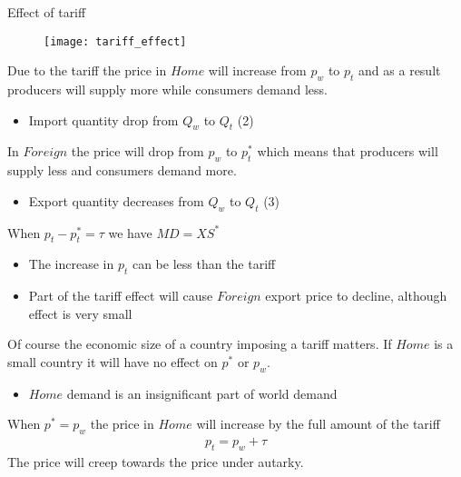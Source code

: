 \documentclass{beamer}
\begin{document}
\begin{frame}{Effect of tariff}
  \begin{figure}
    \texttt{[image: tariff\_effect]}
  \end{figure}
\end{frame}

\begin{frame}
  Due to the tariff the price in $Home$ will increase from $p_{w}$ to $p_t$ and as a result producers will supply more while consumers demand less.
  \begin{itemize}    
    \item Import quantity drop from $Q_w$ to $Q_t$ (2)
  \end{itemize}
  \medskip
  In $Foreign$ the price will drop from $p_w$ to $p_t^*$ which means that producers will supply less and consumers demand more.
  \begin{itemize}    
    \item Export quantity decreases from $Q_w$ to $Q_t$ (3)
  \end{itemize}
  \medskip
  When $p_t-p_t^*=\tau$ we have $MD=XS^*$
  \begin{itemize}
    \item The increase in $p_t$ can be less than the tariff
    \item Part of the tariff effect will cause $Foreign$ export price to decline, although effect is very small
  \end{itemize}
\end{frame}

\begin{frame}
  Of course the economic size of a country imposing a tariff matters. 
  If $Home$ is a small country it will have no effect on $p^*$ or $p_{w}$. 
  \begin{itemize}
    \item $Home$ demand is an insignificant part of world demand
  \end{itemize}
  \medskip
  When $p^*=p_{w}$ the price in $Home$ will increase by the full amount of the tariff
  \begin{align*}
    p_t=p_w+\tau
  \end{align*}
  \medskip
  The price will creep towards the price under autarky. 
\end{frame}
\end{document}
